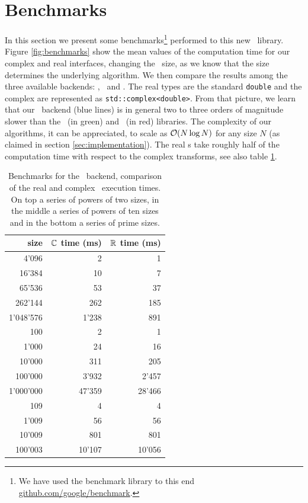\section{Benchmarks}
In this section we present some benchmarks\footnote{We have used the benchmark
library to this end \url{github.com/google/benchmark}.} 
performed to this new \boostfft\
library. Figure \ref{fig:benchmarks} show the mean values of the computation
time for our complex and real interfaces,
changing the \dft\ size, as we know that the size determines the underlying algorithm.
We then compare the results among the three available backends: \bsl, \gsl\ and \fftw.
The real types are the standard \verb|double| and the complex are represented as 
\verb|std::complex<double>|.
From that picture, we learn that our \bsl\ backend (blue lines) is in general two to three
orders of magnitude slower than the \gsl\ (in green) and \fftw\ (in red) libraries. 
The complexity of our algorithms, it can be appreciated, to scale as 
$\mathcal{O}(N \log N)$ for any size $N$ (as claimed in section
\ref{sec:implementation}). The real \dft s take roughly half of the
computation time with respect to the complex transforms, see also table
\ref{tab:benchmarks}.
\begin{table}
    \centering
    \begin{tabular}{rrr}
        \dft\ size & $\mathbb{C}$ time (ms) & $\mathbb{R}$ time (ms) \\
        \hline
4'096    &     2 &   1 \\
16'384   &    10 &   7 \\
65'536   &    53 &  37 \\
262'144  &   262 & 185 \\
1'048'576 &  1'238 & 891 \\
        \hline
100    & 2     & 1 \\
1'000   & 24    & 16 \\
10'000  & 311   & 205 \\
100'000 & 3'932  & 2'457 \\
1'000'000& 47'359 & 28'466 \\
        \hline
109     &    4  &    4  \\
1'009   &    56  &   56  \\
10'009  &   801  &  801  \\
100'003 &  10'107 &10'056  \\
    \end{tabular}
    \caption{Benchmarks for the \bsl\ backend, comparison of the real and
    complex \dft\ execution times. On top a series of powers of two sizes, in
    the middle a series of powers of ten sizes and in the bottom a series of
    prime sizes.}
    \label{tab:benchmarks}
\end{table}
